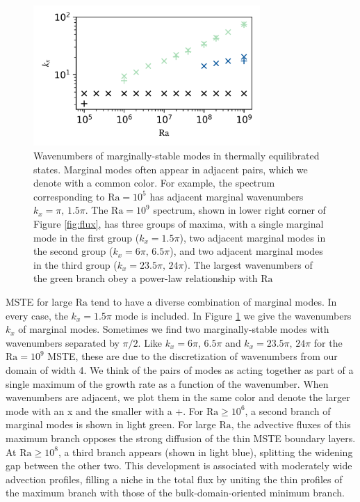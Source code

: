 \documentclass[reprint,amsmath,amssymb,aps]{revtex4-1}
\newcommand\Ra{\mathrm{Ra}}
\begin{document}
\begin{figure}
    \centering
    \includegraphics[width=3.4in]{kx_m_ra1.png}
    \caption{Wavenumbers of marginally-stable modes in thermally equilibrated states. 
    Marginal modes often appear in adjacent pairs, which we denote with a common color. 
    For example, the spectrum corresponding to $\Ra = 10^5$ has adjacent marginal wavenumbers $k_x = \pi, \, 1.5\pi$. 
    The $\Ra = 10^9$ spectrum, shown in lower right corner of Figure \ref{fig:flux}, has three groups of maxima, with a single marginal mode in the first group ($k_x = 1.5\pi$), two adjacent marginal modes in the second group ($k_x = 6\pi, \, 6.5\pi$), and two adjacent marginal modes in the third group ($k_x = 23.5\pi, \, 24\pi$). 
    The largest wavenumbers of the green branch obey a power-law relationship with $\Ra$}
    \label{fig:kx_marginals}
\end{figure}

MSTE for large $\Ra$ tend to have a diverse combination of marginal modes.
In every case, the $k_x = 1.5\pi$ mode is included. 
In Figure \ref{fig:kx_marginals} we give the wavenumbers $k_x$ of marginal modes. 
Sometimes we find two marginally-stable modes with wavenumbers separated by $\pi/2$.
Like $k_x = 6\pi, \, 6.5\pi$ and $k_x=23.5\pi, \, 24\pi$ for the $\Ra=10^9$ MSTE, these are due to the discretization of wavenumbers from our domain of width 4.
We think of the pairs of modes as acting together as part of a single maximum of the growth rate as a function of the wavenumber.
When wavenumbers are adjacent, we plot them in the same color and denote the larger mode with an x and the smaller with a +.
For $\Ra \geq 10^6$, a second branch of marginal modes is shown in light green. 
For large $\Ra$, the advective fluxes of this maximum branch opposes the strong diffusion of the thin MSTE boundary layers. 
At $\Ra \geq 10^8$, a third branch appears (shown in light blue), splitting the widening gap between the other two. 
This development is associated with moderately wide advection profiles, filling a niche in the total flux by uniting the thin profiles of the maximum branch with those of the bulk-domain-oriented minimum branch.
\end{document}
